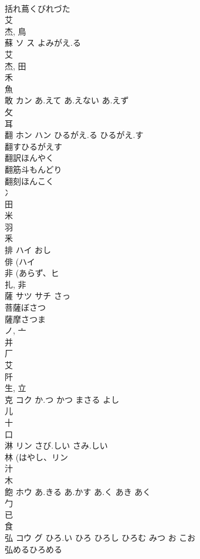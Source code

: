 \documentclass[8pt]{extreport}
\begin{document}
\begin{CJK}{UTF8}{min}
\\	括れ蔦くびれづた 
\\	艾 
\\	杰, 鳥 
\\	蘇	ソ ス	よみがえ.る	
\\	艾 
\\	杰, 田 
\\	禾 
\\	魚 
\\	敢	カン	あ.えて あ.えない あ.えず	
\\	攵 
\\	耳 
\\	翻	ホン ハン	ひるがえ.る ひるがえ.す	
\\	翻すひるがえす
\\	翻訳ほんやく
\\	翻筋斗もんどり
\\	翻刻ほんこく
\\	冫 
\\	田 
\\	米 
\\	羽 
\\	釆 
\\	排	ハイ	おし	
\\	俳 (ハイ 
\\	非 (あらず、ヒ 
\\	扎, 非 
\\	薩	サツ サチ	さっ	
\\	菩薩ぼさつ 
\\	薩摩さつま 
\\	ノ, 亠 
\\	并 
\\	厂 
\\	艾 
\\	阡 
\\	生, 立 
\\	克	コク	か.つ かつ まさる よし	
\\	儿 
\\	十 
\\	口 
\\	淋	リン	さび.しい さみ.しい	
\\	林 (はやし、リン 
\\	汁 
\\	木 
\\	飽	ホウ	あ.きる あ.かす あ.く あき あく	
\\	勹 
\\	已 
\\	食 
\\	弘	コウ グ	ひろ.い ひろ ひろし ひろむ みつ お こお	
\\	弘めるひろめる

\end{CJK}
\end{document}
